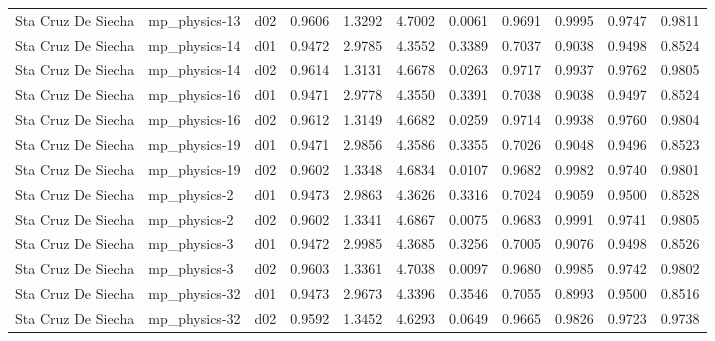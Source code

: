\begin{longtable}{lllrrrrrrrr}
   Sta Cruz De Siecha  &         mp\_physics-13 &     d02 &   0.9606 &   1.3292 &   4.7002 &       0.0061 &        0.9691 &       0.9995 &           0.9747 &  0.9811 \\
   Sta Cruz De Siecha  &         mp\_physics-14 &     d01 &   0.9472 &   2.9785 &   4.3552 &       0.3389 &        0.7037 &       0.9038 &           0.9498 &  0.8524 \\
   Sta Cruz De Siecha  &         mp\_physics-14 &     d02 &   0.9614 &   1.3131 &   4.6678 &       0.0263 &        0.9717 &       0.9937 &           0.9762 &  0.9805 \\
   Sta Cruz De Siecha  &         mp\_physics-16 &     d01 &   0.9471 &   2.9778 &   4.3550 &       0.3391 &        0.7038 &       0.9038 &           0.9497 &  0.8524 \\
   Sta Cruz De Siecha  &         mp\_physics-16 &     d02 &   0.9612 &   1.3149 &   4.6682 &       0.0259 &        0.9714 &       0.9938 &           0.9760 &  0.9804 \\
   Sta Cruz De Siecha  &         mp\_physics-19 &     d01 &   0.9471 &   2.9856 &   4.3586 &       0.3355 &        0.7026 &       0.9048 &           0.9496 &  0.8523 \\
   Sta Cruz De Siecha  &         mp\_physics-19 &     d02 &   0.9602 &   1.3348 &   4.6834 &       0.0107 &        0.9682 &       0.9982 &           0.9740 &  0.9801 \\
   Sta Cruz De Siecha  &          mp\_physics-2 &     d01 &   0.9473 &   2.9863 &   4.3626 &       0.3316 &        0.7024 &       0.9059 &           0.9500 &  0.8528 \\
   Sta Cruz De Siecha  &          mp\_physics-2 &     d02 &   0.9602 &   1.3341 &   4.6867 &       0.0075 &        0.9683 &       0.9991 &           0.9741 &  0.9805 \\
   Sta Cruz De Siecha  &          mp\_physics-3 &     d01 &   0.9472 &   2.9985 &   4.3685 &       0.3256 &        0.7005 &       0.9076 &           0.9498 &  0.8526 \\
   Sta Cruz De Siecha  &          mp\_physics-3 &     d02 &   0.9603 &   1.3361 &   4.7038 &       0.0097 &        0.9680 &       0.9985 &           0.9742 &  0.9802 \\
   Sta Cruz De Siecha  &         mp\_physics-32 &     d01 &   0.9473 &   2.9673 &   4.3396 &       0.3546 &        0.7055 &       0.8993 &           0.9500 &  0.8516 \\
   Sta Cruz De Siecha  &         mp\_physics-32 &     d02 &   0.9592 &   1.3452 &   4.6293 &       0.0649 &        0.9665 &       0.9826 &           0.9723 &  0.9738 \\

\end{longtable}

